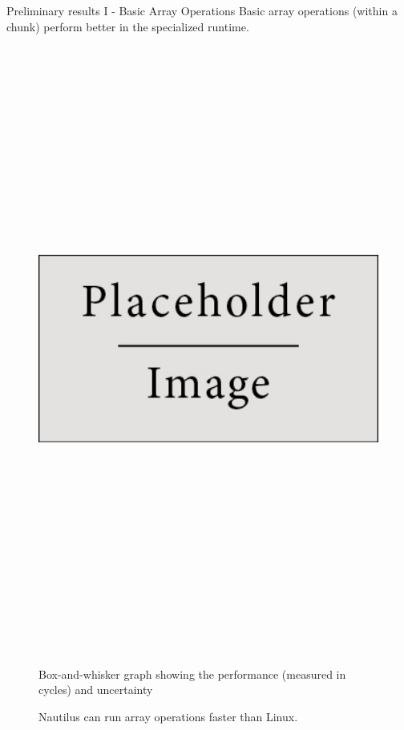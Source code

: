 \begin{block}{Preliminary results I - Basic Array Operations}
  Basic array operations (within a chunk) perform better in the specialized runtime.

  \begin{figure}
    \includegraphics[height=20cm]{place_holder.png}

    Box-and-whisker graph showing the performance (measured in cycles) and uncertainty
    \caption{Nautilus can run array operations faster than Linux.}
  \end{figure}



\end{block}
